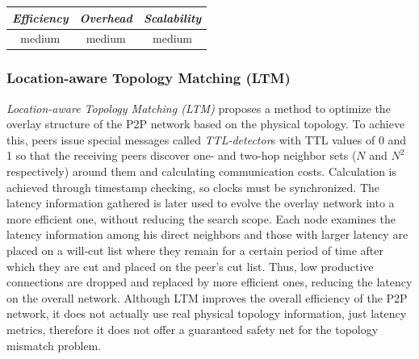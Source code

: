 
\begin{center}
\begin{tabular}{ccc}
\emph{Efficiency} & \emph{Overhead} & \emph{Scalability} \\
\hline
medium &
medium &
medium
\end{tabular}
\end{center}

\subsubsection{Location-aware Topology Matching (LTM)}
\emph{Location-aware Topology Matching (LTM)} \cite{LLXNZ2004} proposes a
method to optimize the overlay structure of the P2P network based on the
physical topology. To achieve this, peers issue special messages called
\textit{TTL-detector}s with TTL values of 0 and 1 so that the receiving peers
discover one- and two-hop neighbor sets ($N$ and $N^2$ respectively) around
them and calculating communication costs. Calculation is achieved through
timestamp checking, so clocks must be synchronized. The latency information
gathered is later used to evolve the overlay network into a more efficient one,
without reducing the search scope. Each node examines the latency information
among his direct neighbors and those with larger latency are placed on a
will-cut list where they remain for a certain period of time after which they are
cut and placed on the peer's cut list. Thus, low productive
connections are dropped and replaced by more efficient ones, reducing the
latency on the overall network. Although LTM improves the overall efficiency of
the P2P network, it does not actually use real physical topology information,
just latency metrics, therefore it does not offer a guaranteed safety net for
the topology mismatch problem.

